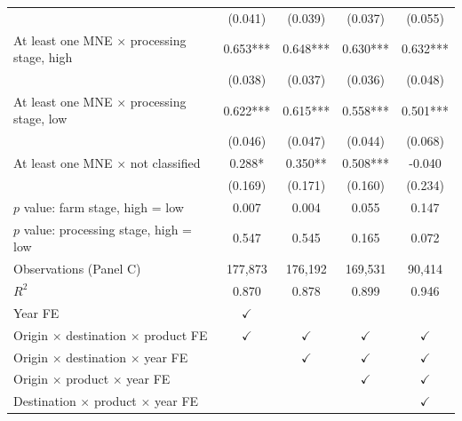 \begin{tabular}{l*{4}{c}}
 & (0.041) & (0.039) & (0.037) & (0.055) \\
At least one MNE $\times$ processing stage, high & 0.653*** & 0.648*** & 0.630*** & 0.632*** \\
 & (0.038) & (0.037) & (0.036) & (0.048) \\
At least one MNE $\times$ processing stage, low & 0.622*** & 0.615*** & 0.558*** & 0.501*** \\
 & (0.046) & (0.047) & (0.044) & (0.068) \\
At least one MNE $\times$ not classified & 0.288* & 0.350** & 0.508*** & -0.040 \\
 & (0.169) & (0.171) & (0.160) & (0.234) \\
$p$ value: farm stage, high = low & 0.007 & 0.004 & 0.055 & 0.147 \\
$p$ value: processing stage, high = low & 0.547 & 0.545 & 0.165 & 0.072 \\
Observations (Panel C) & 177,873 & 176,192 & 169,531 & 90,414 \\
$R^2$ & 0.870 & 0.878 & 0.899 & 0.946 \\
\midrule
Year FE & $\checkmark$ &  &  &  \\
Origin $\times$ destination $\times$ product FE & $\checkmark$ & $\checkmark$ & $\checkmark$ & $\checkmark$ \\
Origin $\times$ destination $\times$ year FE &  & $\checkmark$ & $\checkmark$ & $\checkmark$ \\
Origin $\times$ product $\times$ year FE &  &  & $\checkmark$ & $\checkmark$ \\
Destination $\times$ product $\times$ year FE &  &  &  & $\checkmark$ \\
\bottomrule
\end{tabular}

